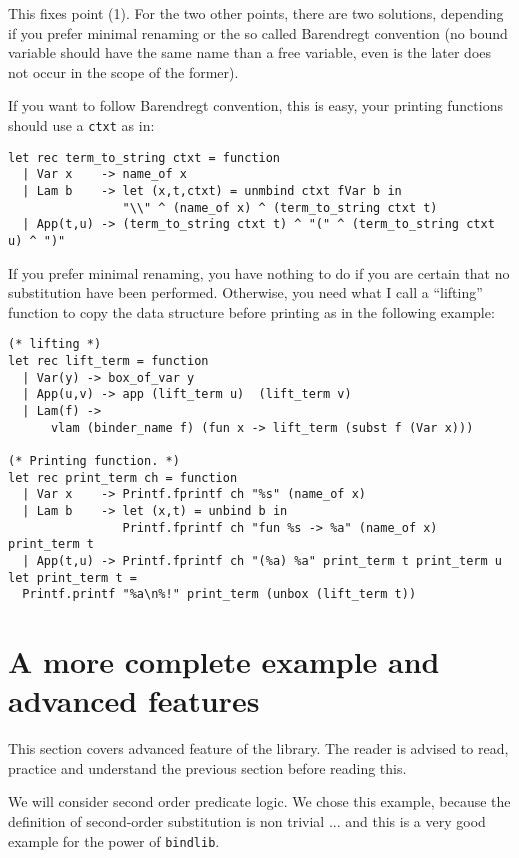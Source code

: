 \documentclass[11pt]{article}
\begin{document}
This fixes point (1). For the two other points, there are two solutions,
depending if you prefer minimal renaming or the so called Barendregt
convention (no bound variable should have the same name than a free
variable, even is the later does not occur in the scope of the
former).

If you want to follow Barendregt convention, this is easy, your
printing functions should use a \verb#ctxt# as in:

\begin{verbatim}
let rec term_to_string ctxt = function
  | Var x    -> name_of x
  | Lam b    -> let (x,t,ctxt) = unmbind ctxt fVar b in
                "\\" ^ (name_of x) ^ (term_to_string ctxt t)
  | App(t,u) -> (term_to_string ctxt t) ^ "(" ^ (term_to_string ctxt u) ^ ")"
\end{verbatim}

If you prefer minimal renaming, you have nothing to do if you are
certain that no substitution have been performed. Otherwise, you need
what I call a ``lifting'' function to copy the data structure before
printing as in the following example:

\begin{verbatim}
(* lifting *)
let rec lift_term = function
  | Var(y) -> box_of_var y
  | App(u,v) -> app (lift_term u)  (lift_term v)
  | Lam(f) ->
      vlam (binder_name f) (fun x -> lift_term (subst f (Var x)))

(* Printing function. *)
let rec print_term ch = function
  | Var x    -> Printf.fprintf ch "%s" (name_of x)
  | Lam b    -> let (x,t) = unbind b in
                Printf.fprintf ch "fun %s -> %a" (name_of x) print_term t
  | App(t,u) -> Printf.fprintf ch "(%a) %a" print_term t print_term u
let print_term t =
  Printf.printf "%a\n%!" print_term (unbox (lift_term t))
\end{verbatim}

\section{A more complete example and advanced features}

This section covers advanced feature of the library. The reader is
advised to read, practice and understand the previous section before
reading this.

We will consider second order predicate logic.
We chose this example, because the definition of second-order
substitution is non trivial ... and this is a very good example for
the power of \verb#bindlib#.
\end{document}
